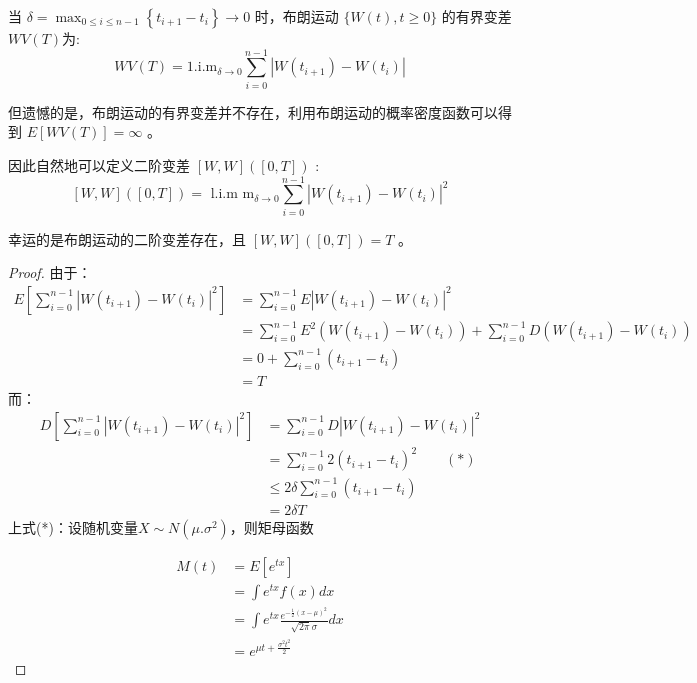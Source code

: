 当 $\delta=\max _{0 \leq i \leq n-1}\left\{t_{i+1}-t_i\right\} \rightarrow 0$ 时，布朗运动 $\{W(t), t \geq 0\}$ 的有界变差 $W V(T)$为:
$$
W V(T)=1 . \mathrm{i} . \mathrm{m}_{\delta \rightarrow 0} \sum_{i=0}^{n-1}\left|W\left(t_{i+1}\right)-W\left(t_i\right)\right|
$$

但遗憾的是，布朗运动的有界变差并不存在，利用布朗运动的概率密度函数可以得到 $E[W V(T)]=\infty$ 。

因此自然地可以定义二阶变差 $[W, W]([0, T])$ :
$$
[W, W]([0, T])=\text { l.i.m } \mathrm{m}_{\delta \rightarrow 0} \sum_{i=0}^{n-1}\left|W\left(t_{i+1}\right)-W\left(t_i\right)\right|^2
$$

幸运的是布朗运动的二阶变差存在，且 $[W, W]([0, T])=T$ 。
\begin{proof}
  由于：
  \begin{equation}
    \begin{aligned}
      E\left[\sum_{i=0}^{n-1}\left|W\left(t_{i+1}\right)-W\left(t_i\right)\right|^2\right] & =\sum_{i=0}^{n-1} E\left|W\left(t_{i+1}\right)-W\left(t_i\right)\right|^2 \\
      & =\sum_{i=0}^{n-1} E^2\left(W\left(t_{i+1}\right)-W\left(t_i\right)\right)+\sum_{i=0}^{n-1} D\left(W\left(t_{i+1}\right)-W\left(t_i\right)\right) \\
      & =0+\sum_{i=0}^{n-1}\left(t_{i+1}-t_i\right) \\
      & =T
    \end{aligned}
  \end{equation}
  而：
  \begin{equation}
  \begin{aligned}
    D\left[\sum_{i=0}^{n-1}\left|W\left(t_{i+1}\right)-W\left(t_i\right)\right|^2\right] & =\sum_{i=0}^{n-1} D\left|W\left(t_{i+1}\right)-W\left(t_i\right)\right|^2 \\
    & =\sum_{i=0}^{n-1} 2\left(t_{i+1}-t_i\right)^2  \qquad(*)\\
    & \leq 2 \delta \sum_{i=0}^{n-1}\left(t_{i+1}-t_i\right) \\
    & =2 \delta T
  \end{aligned}
\end{equation}
上式(*)：设随机变量$X \sim N(\mu. \sigma^2)$，则矩母函数

$$
\begin{aligned}
M(t) & =E\left[e^{t x}\right] \\
& =\int e^{t x} f(x) d x \\
& =\int e^{t x} \frac{e^{-\frac{1}{2}(x-\mu)^2}}{\sqrt{2 \pi} \sigma} d x \\
& =e^{\mu t+\frac{\sigma^2 t^2}{2}}
\end{aligned}
$$


\end{proof}
